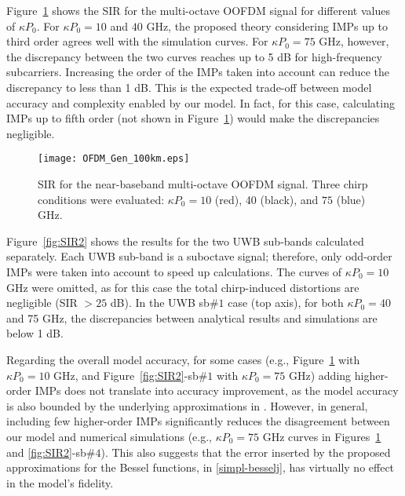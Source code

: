 \documentclass[journal]{IEEEtran}
\begin{document}
Figure~\ref{fig:SIR1} shows the SIR for the multi-octave OOFDM signal for different values of $\kappa P_0$. For $\kappa P_0 = 10$ and $40$ GHz, the proposed theory considering IMPs up to third order agrees well with the simulation curves. For $\kappa P_0 = 75$ GHz, however, the discrepancy between the two curves reaches up to 5 dB for high-frequency subcarriers. Increasing the order of the IMPs taken into account can reduce the discrepancy to less than 1 dB. This is the expected trade-off between model accuracy and complexity enabled by our model. In fact, for this case, calculating IMPs up to fifth order (not shown in Figure~\ref{fig:SIR1}) would make the discrepancies negligible.
\begin{figure}[t]
\centering
\texttt{[image: OFDM\_Gen\_100km.eps]}
\caption{SIR for the near-baseband multi-octave OOFDM signal. Three chirp conditions were evaluated: $\kappa P_0 = 10$ (red), 40 (black), and $75$ (blue) GHz.} \label{fig:SIR1}
\end{figure}

Figure~\ref{fig:SIR2} shows the results for the two UWB sub-bands calculated separately. Each UWB sub-band is a suboctave signal; therefore, only odd-order IMPs were taken into account to speed up calculations. The curves of $\kappa P_0 = 10$ GHz were omitted, as for this case the total chirp-induced distortions are negligible (SIR $> 25$ dB). In the UWB sb$\#1$ case (top axis), for both $\kappa P_0 = 40$ and 75 GHz, the discrepancies between analytical results and simulations are below 1 dB. 

Regarding the overall model accuracy, for some cases (e.g., Figure~\ref{fig:SIR1} with $\kappa P_0 = 10$ GHz, and Figure~\ref{fig:SIR2}-sb$\#1$ with $\kappa P_0 = 75$ GHz) adding higher-order IMPs does not translate into accuracy improvement, as the model accuracy is also bounded by the underlying approximations in \cite{eva}. However, in general, including few higher-order IMPs significantly reduces the disagreement between our model and numerical simulations (e.g., $\kappa P_0 = 75$ GHz curves in Figures~\ref{fig:SIR1} and \ref{fig:SIR2}-sb$\#4$). This also suggests that the error inserted by the proposed approximations for the Bessel functions, in \eqref{simpl-besselj}, has virtually no effect in the model's fidelity.

\end{document}

